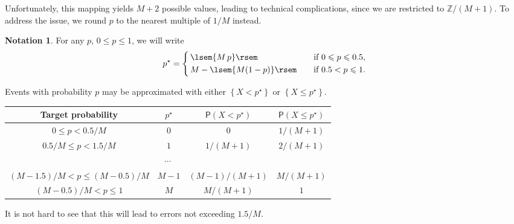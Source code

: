 \documentclass{article}
\renewcommand{\leq}{\leqslant}
\renewcommand{\Pr}{\mathsf{P}}
\theoremstyle{definition} %
\newtheorem*{notation}{Notation}
\newcommand{\round}[1]{\lsem{#1}\rsem}
\newcommand{\Integers}{\mathbb{Z}}  %
\newcommand{\set}[1]{\left\{ {#1} \right\}} %
\begin{document}
%
Unfortunately, this mapping yields $M + 2$ possible values, leading to technical complications, since we are restricted to $\Integers / (M + 1)$.
%
To address the issue, we round $p$ to the nearest multiple of $1 / M$ instead.
%
\begin{notation}
    For any $p$, $0 \leq p \leq 1$, we will write
    \[
        p ^\star = \begin{dcases}
            \, \round{M \, p} \quad & \text{if $0 \leq p \leq 0.5$}, \\
            \, M - \round{M (1 - p)} \quad & \text{if $0.5 < p \leq 1$}.
        \end{dcases}
    \]
\end{notation}
%
Events with probability $p$ may be approximated with either $\set{X < p^\star }$ or $\set{X \leq p^\star }$.
%
\begin{center}
    \renewcommand{\arraystretch}{1.4}
    \begin{tabular}{|c|c||c|c|}
        \hline
        Target probability                      & $p^\star $ & $\Pr (X < p^\star )$ & $\Pr (X \leq p^\star )$  \\ \hline\hline
        \hspace{2em} $0 \leq p < 0.5 / M$       & $0$        & $0$                  & $1 / (M + 1)$            \\ \hline
        $0.5 / M \leq p < 1.5 / M$              & $1$        & $1 / (M + 1)$        & $2 / (M + 1)$            \\ \hline
        \multicolumn{4}{c}{$\cdots $} \\ \hline
        $(M - 1.5) / M < p \leq (M - 0.5) / M$  & $M - 1$    & $(M - 1) / (M + 1)$  & $M / (M + 1)$            \\ \hline
        $(M - 0.5) / M < p \leq 1$ \hspace{5em} & $M$        & $M / (M + 1)$        & $1$                      \\ \hline
    \end{tabular}
\end{center}
%
It is not hard to see that this will lead to errors not exceeding $1.5 / M$.
\end{document}
